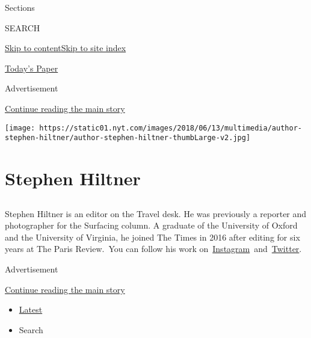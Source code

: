 Sections

SEARCH

\protect\hyperlink{site-content}{Skip to
content}\protect\hyperlink{site-index}{Skip to site index}

\href{https://myaccount.nytimes.com/auth/login?response_type=cookie\&client_id=vi}{}

\href{https://www.nytimes.com/section/todayspaper}{Today's Paper}

Advertisement

\protect\hyperlink{after-top}{Continue reading the main story}

\texttt{[image: https://static01.nyt.com/images/2018/06/13/multimedia/author-stephen-hiltner/author-stephen-hiltner-thumbLarge-v2.jpg]}

\hypertarget{stephen-hiltner}{%
\section{Stephen Hiltner}\label{stephen-hiltner}}

\subsection{}

Stephen Hiltner is an editor on the Travel desk. He was previously a
reporter and photographer for the Surfacing column. A graduate of the
University of Oxford and the University of Virginia, he joined The Times
in 2016 after editing for six years at The Paris Review.~You can follow
his work
on~\href{https://www.instagram.com/sahiltner/}{Instagram}~and~\href{https://twitter.com/sahiltner}{Twitter}.

Advertisement

\protect\hyperlink{after-mid1}{Continue reading the main story}

\begin{itemize}
\tightlist
\item
  \protect\hyperlink{stream-panel}{Latest}
\item
  Search
\end{itemize}

